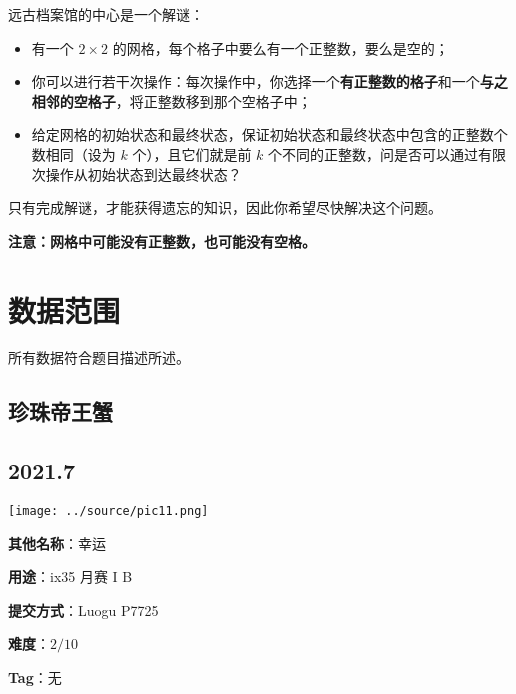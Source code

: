 \documentclass[a4paper,10pt]{article}
\begin{document}
远古档案馆的中心是一个解谜：

\begin{itemize}
\item 有一个 $2\times 2$ 的网格，每个格子中要么有一个正整数，要么是空的；

\item 你可以进行若干次操作：每次操作中，你选择一个\textbf{有正整数的格子}和一个\textbf{与之相邻的空格子}，将正整数移到那个空格子中；

\item 给定网格的初始状态和最终状态，保证初始状态和最终状态中包含的正整数个数相同（设为 $k$ 个），且它们就是前 $k$ 个不同的正整数，问是否可以通过有限次操作从初始状态到达最终状态？
\end{itemize}

只有完成解谜，才能获得遗忘的知识，因此你希望尽快解决这个问题。

\textbf{注意：网格中可能没有正整数，也可能没有空格。}

\section*{数据范围}

所有数据符合题目描述所述。

\newpage

\vspace*{\fill}
\begin{center}

\section{珍珠帝王蟹}

\subsection*{2021.7}

\vspace{10pt}

\texttt{[image: ../source/pic11.png]}

\vspace{10pt}

\textbf{其他名称}：幸运

\vspace{10pt}

\textbf{用途}：ix35 月赛 I B

\vspace{10pt}

\textbf{提交方式}：Luogu P7725

\vspace{10pt}

\textbf{难度}：$2/10$

\vspace{10pt}

\textbf{Tag}：无

\end{center}
\vspace*{\fill}
\end{document}

